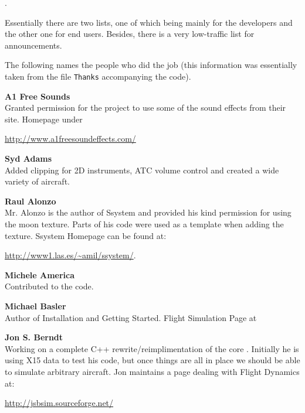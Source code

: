  .
  \medskip

\noindent
 Essentially there are two lists, one of which being mainly for the developers
and the other one for end users. Besides, there is a very low-traffic list for
announcements.
\medskip

 \noindent
The following names the people who did the job (this information was essentially taken
from the file \texttt{Thanks} accompanying the code).
 \medskip

\noindent \textbf{A1 Free Sounds}\\
   Granted permission for the \FlightGear{} project to use some of the sound effects from their
   site. Homepage under
   \medskip

   \href{http://www.a1freesoundeffects.com/}{http://www.a1freesoundeffects.com/}
   \medskip

\noindent \textbf{Syd Adams}\\
  Added clipping for 2D instruments, ATC volume control and created a wide variety of aircraft.
 \medskip

\noindent \textbf{Raul Alonzo}\\
   Mr. Alonzo is the
 author of Ssystem and provided his kind permission for using the moon texture.
 Parts of his code were used as a template when adding the texture.
  Ssystem Homepage can be found at:
   \medskip

  \href{http://www1.las.es/~amil/ssystem/}{http://www1.las.es/\~{}amil/ssystem/}.
 \medskip

 \noindent \textbf{Michele America}\\
  Contributed to the  code.
 \medskip

\noindent \textbf{Michael Basler}\\
 Author of Installation and Getting Started. Flight Simulation Page at
  \medskip

\medskip

\noindent \textbf{Jon S. Berndt}\\
 Working on a complete C++ rewrite/reimplimentation of the core .
  Initially he is using X15 data to test his code, but once things are
  all in place we should be able to simulate arbitrary aircraft. Jon
  maintains a page dealing with Flight Dynamics at:
   \medskip

  \href{http://jsbsim.sourceforge.net/}{http://jsbsim.sourceforge.net/}
   \medskip

